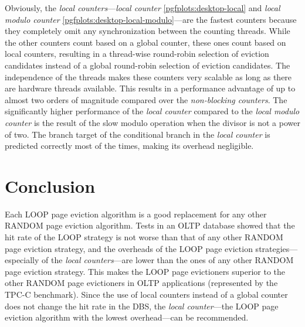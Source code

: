 \begin{@empty}
    Obviously, the \emph{local counters}---\emph{local counter} \ref{pgfplots:desktop-local} and \emph{local modulo counter} \ref{pgfplots:desktop-local-modulo}---are the fastest counters because they completely omit any synchronization between the counting threads. While the other counters count based on a global counter, these ones count based on local counters, resulting in a thread-wise round-robin selection of eviction candidates instead of a global round-robin selection of eviction candidates. The independence of the threads makes these counters very scalable as long as there are hardware threads available. This results in a performance advantage of up to almost two orders of magnitude compared over the \emph{non-blocking counters}. The significantly higher performance of the \emph{local counter} compared to the \emph{local modulo counter} is the result of the slow modulo operation when the divisor is not a power of two. The branch target of the conditional branch in the \emph{local counter} is predicted correctly most of the times, making its overhead negligible.
\end{@empty}

\section{Conclusion}

    Each LOOP page eviction algorithm is a good replacement for any other RANDOM page eviction algorithm. Tests in an OLTP database showed that the hit rate of the LOOP strategy is not worse than that of any other RANDOM page eviction strategy, and the overheads of the LOOP page eviction strategies---especially of the \emph{local counters}---are lower than the ones of any other RANDOM page eviction strategy. This makes the LOOP page evictioners superior to the other RANDOM page evictioners in OLTP applications (represented by the TPC-C benchmark). Since the use of local counters instead of a global counter does not change the hit rate in the DBS, the \emph{local counter}---the LOOP page eviction algorithm with the lowest overhead---can be recommended.
